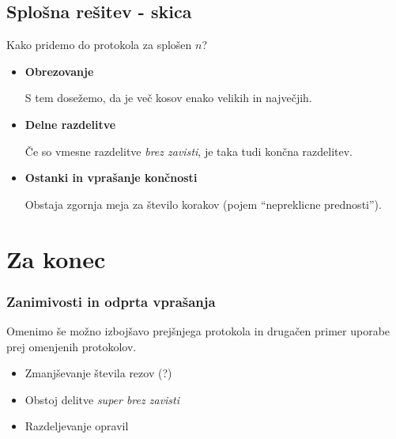 \documentclass{beamer}
\begin{document}
\subsection{Splošna rešitev - skica}
\begin{frame}

Kako pridemo do protokola za splošen $n$?

\begin{itemize}

\item \textbf{Obrezovanje} 

S tem dosežemo, da je več kosov enako velikih in največjih.

\item \textbf{Delne razdelitve} 

Če so vmesne razdelitve {\em brez zavisti}, je taka tudi končna razdelitev.

\item \textbf{Ostanki in vprašanje končnosti} 

Obstaja zgornja meja za število korakov (pojem ``nepreklicne prednosti'').

\end{itemize}

\end{frame}

\section{Za konec}

\begin{frame}

\frametitle{Zanimivosti in odprta vprašanja}

Omenimo še možno izbojšavo prejšnjega protokola in drugačen primer uporabe prej omenjenih protokolov.

\begin{itemize}

\item Zmanjševanje števila rezov (?)

\item Obstoj  delitve {\em super brez zavisti}

\item Razdeljevanje opravil

\end{itemize}

\end{frame}

\end{document}
